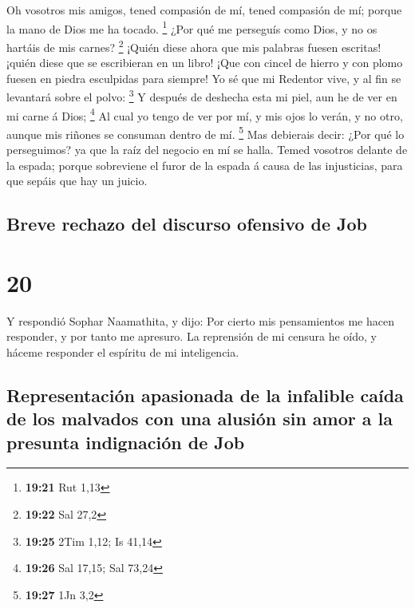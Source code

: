  Oh vosotros mis amigos, tened compasión de mí, tened
compasión de mí; porque la mano de Dios me ha tocado. \footnote{\textbf{19:21}
  Rut 1,13}  ¿Por qué me perseguís como Dios, y no os
hartáis de mis carnes? \footnote{\textbf{19:22} Sal 27,2}
 ¡Quién diese ahora que mis palabras fuesen escritas!
¡quién diese que se escribieran en un libro!  ¡Que con
cincel de hierro y con plomo fuesen en piedra esculpidas para siempre!
 Yo sé que mi Redentor vive, y al fin se levantará sobre
el polvo: \footnote{\textbf{19:25} 2Tim 1,12; Is 41,14} 
Y después de deshecha esta mi piel, aun he de ver en mi carne á Dios;
\footnote{\textbf{19:26} Sal 17,15; Sal 73,24}  Al cual
yo tengo de ver por mí, y mis ojos lo verán, y no otro, aunque mis
riñones se consuman dentro de mí. \footnote{\textbf{19:27} 1Jn 3,2}
 Mas debierais decir: ¿Por qué lo perseguimos? ya que la
raíz del negocio en mí se halla.  Temed vosotros delante
de la espada; porque sobreviene el furor de la espada á causa de las
injusticias, para que sepáis que hay un juicio.

\hypertarget{breve-rechazo-del-discurso-ofensivo-de-job}{%
\subsection{Breve rechazo del discurso ofensivo de
Job}\label{breve-rechazo-del-discurso-ofensivo-de-job}}

\hypertarget{section-19}{%
\section{20}\label{section-19}}

 Y respondió Sophar Naamathita, y dijo:  Por
cierto mis pensamientos me hacen responder, y por tanto me apresuro.
 La reprensión de mi censura he oído, y háceme responder
el espíritu de mi inteligencia.

\hypertarget{representaciuxf3n-apasionada-de-la-infalible-cauxedda-de-los-malvados-con-una-alusiuxf3n-sin-amor-a-la-presunta-indignaciuxf3n-de-job}{%
\subsection{Representación apasionada de la infalible caída de los
malvados con una alusión sin amor a la presunta indignación de
Job}\label{representaciuxf3n-apasionada-de-la-infalible-cauxedda-de-los-malvados-con-una-alusiuxf3n-sin-amor-a-la-presunta-indignaciuxf3n-de-job}}

